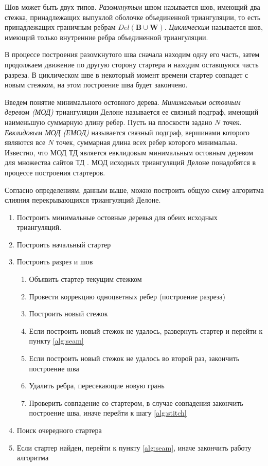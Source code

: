 \documentclass[12pt]{article}
\begin{document}
Шов может быть двух типов.
{\itshape Разомкнутым} швом называется шов, имеющий два стежка, принадлежащих выпуклой оболочке объединенной триангуляции,
то есть принадлежащих граничным ребрам $Del(\textbf{B} \cup \textbf{W})$.
{\itshape Циклическим} называется шов, имеющий только внутренние ребра объединенной триангуляции.

В процессе построения разомкнутого шва сначала находим одну его часть,
затем продолжаем движение по другую сторону стартера и находим оставшуюся часть разреза.
В циклическом шве в некоторый момент времени стартер совпадет с новым стежком,
на этом построение шва будет закончено.

Введем понятие минимального остовного дерева.
{\itshape Минимальным остовным деревом (МОД)} триангуляции Делоне называется ее связный подграф,
имеющий наименьшую суммарную длину ребер.
Пусть на плоскости задано $N$ точек.
{\itshape Евклидовым МОД (ЕМОД)} называется связный подграф,
вершинами которого являются все $N$ точек, суммарная длина всех ребер которого минимальна.
Известно, что МОД ТД является евклидовым минимальным остовным деревом для множества сайтов ТД \cite[стр. 229, 277]{Preparata}.
МОД исходных триангуляций Делоне понадобятся в процессе построения стартеров.

Согласно определениям, данным выше, можно построить общую схему алгоритма слияния перекрывающихся триангуляций Делоне.

\begin{enumerate}
	\item Построить минимальные остовные деревья для обеих исходных триангуляций.
	\item Построить начальный стартер
	\item \label{alg:seam} Построить разрез и шов
	\begin{enumerate}
		\item Объявить стартер текущим стежком
		\item Провести коррекцию одноцветных ребер (построение разреза)
		\item \label{alg:stitch} Построить новый стежок
		\item Если построить новый стежок не удалось, развернуть стартер и перейти к пункту \ref{alg:seam}
		\item Если построить новый стежок не удалось во второй раз, закончить построение шва
		\item Удалить ребра, пересекающие новую грань
		\item Проверить совпадение со стартером, в случае совпадения закончить построение шва, иначе перейти к шагу \ref{alg:stitch}
	\end{enumerate}
	\item Поиск очередного стартера
	\item Если стартер найден, перейти к пункту \ref{alg:seam}, иначе закончить работу алгоритма
\end{enumerate}
\end{document}
